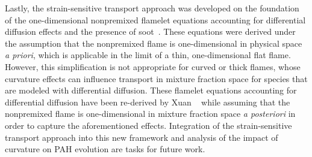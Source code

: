 Lastly, the strain-sensitive transport approach was developed on the foundation of the one-dimensional nonpremixed flamelet equations accounting for differential diffusion effects and the presence of soot~\cite{pitsch1998,muellerphd}. These equations were derived under the assumption that the nonpremixed flame is one-dimensional in physical space \textit{a priori}, which is applicable in the limit of a thin, one-dimensional flat flame. However, this simplification is not appropriate for curved or thick flames, whose curvature effects can influence transport in mixture fraction space for species that are modeled with differential diffusion. These flamelet equations accounting for differential diffusion have been re-derived by Xuan \etal~\cite{xuan2014} while assuming that the nonpremixed flame is one-dimensional in mixture fraction space \textit{a posteriori} in order to capture the aforementioned effects. Integration of the strain-sensitive transport approach into this new framework and analysis of the impact of curvature on PAH evolution are tasks for future work.
